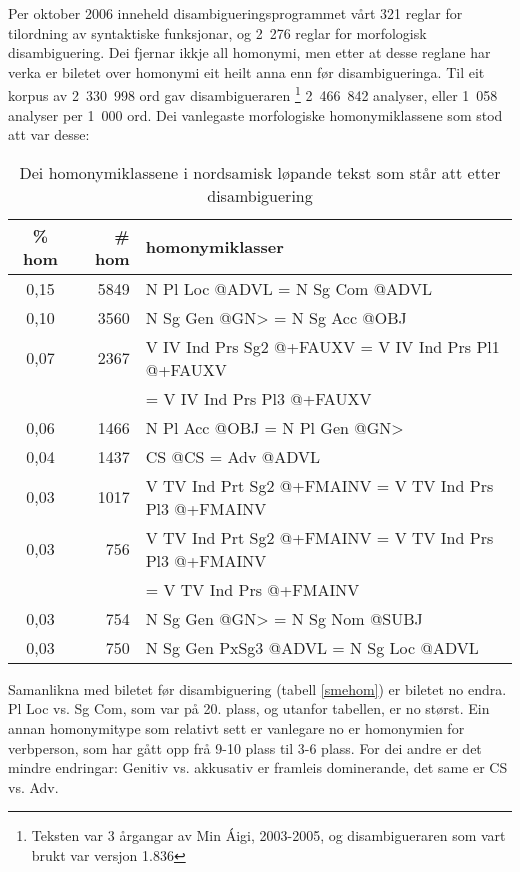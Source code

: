 \documentclass[a4paper,norsk]{article}
\begin{document}
Per oktober 2006 inneheld disambigueringsprogrammet vårt 321 reglar for tilordning av syntaktiske funksjonar, og 2\ 276 reglar for morfologisk disambiguering. Dei fjernar ikkje all homonymi, men etter at desse reglane har verka er biletet over homonymi eit heilt anna enn før disambigueringa. Til eit korpus av 2\ 330\ 998 ord gav disambigueraren \footnote{Teksten var 3 årgangar av Min Áigi, 2003-2005, og disambigueraren som vart brukt var versjon 1.836} 2\ 466\ 842 analyser, eller 1\ 058 analyser per 1\ 000 ord. Dei vanlegaste morfologiske homonymiklassene som stod att var desse:



\begin{table}[htdp]
\caption{Dei homonymiklassene i nordsamisk løpande tekst som står att etter disambiguering}
\begin{center}
\begin{tabular}{|c|r|l|}
\hline
\% hom & \# hom & homonymiklasser \\
\hline
0,15 & 5849 & N Pl Loc @ADVL = N Sg Com @ADVL \\ 
0,10 & 3560 & N Sg Gen @GN> = N Sg Acc @OBJ \\ 
0,07 & 2367 & V IV Ind Prs Sg2 @+FAUXV = V IV Ind Prs Pl1 @+FAUXV \\
     &      &  = V IV Ind Prs Pl3 @+FAUXV \\ 
0,06 & 1466 & N Pl Acc @OBJ = N Pl Gen @GN> \\ 
0,04 & 1437 & CS @CS = Adv @ADVL \\ 
0,03 & 1017 & V TV Ind Prt Sg2 @+FMAINV = V TV Ind Prs Pl3 @+FMAINV \\ 
0,03 & 756 & V TV Ind Prt Sg2 @+FMAINV = V TV Ind Prs Pl3 @+FMAINV \\
     &     &  = V TV Ind Prs @+FMAINV \\ 
0,03 & 754 & N Sg Gen @GN> = N Sg Nom @SUBJ \\ 
0,03 & 750 & N Sg Gen PxSg3 @ADVL = N Sg Loc @ADVL \\ 
\hline
\end{tabular}
\end{center}
\label{smedishom}
\end{table}%


Samanlikna med biletet før disambiguering (tabell \ref{smehom}) er biletet no endra. Pl Loc vs. Sg Com, som var på 20. plass, og utanfor tabellen, er no størst. Ein annan homonymitype som relativt sett er vanlegare no er homonymien for verbperson, som har gått opp frå 9-10 plass til 3-6 plass. For dei andre er det mindre endringar: Genitiv vs. akkusativ er framleis dominerande, det same er CS vs. Adv.
\end{document}
